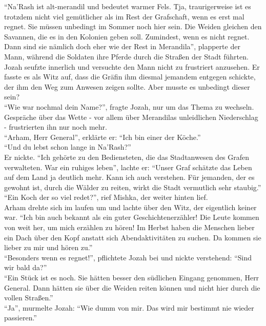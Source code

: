 ``Na'Rash ist alt-merandil und bedeutet warmer Fels. Tja, traurigerweise ist es trotzdem nicht 
viel gemütlicher als im Rest der Grafschaft, wenn es erst mal regnet. Sie müssen unbedingt im 
Sommer noch hier sein. Die Weiden gleichen den Savannen, die es in den Kolonien geben soll. 
Zumindest, wenn es nicht regnet. Dann sind sie nämlich doch eher wie der Rest in Merandila'', 
plapperte der Mann, während die Soldaten ihre Pferde durch die Straßen der Stadt führten.\\
Jozah seufzte innerlich und versuchte den Mann nicht zu frustriert anzusehen. Er fasste es als Witz 
auf, dass die Gräfin ihm diesmal jemandem entgegen schickte, der ihm den Weg zum Anwesen zeigen 
sollte. Aber musste es unbedingt dieser sein?\\
``Wie war nochmal dein Name?'', fragte Jozah, nur um das Thema zu wechseln. Gespräche über das 
Wette - vor allem über Merandilas unleidlichen Niederschlag - frustrierten ihn nur noch mehr.\\
``Arham, Herr General'', erklärte er: ``Ich bin einer der Köche.''\\
``Und du lebst schon lange in Na'Rash?''\\
Er nickte. ``Ich gehörte zu den Bediensteten, die das Stadtanwesen des Grafen verwalteten. War ein 
ruhiges leben'', lachte er: ``Unser Graf schätzte das Leben auf dem Land ja deutlich mehr. Kann ich 
auch verstehen. Für jemanden, der es gewohnt ist, durch die Wälder zu reiten, wirkt die Stadt 
vermutlich sehr staubig.''\\
``Ein Koch der so viel redet?'', rief Mishka, der weiter hinten lief.\\
Arham drehte sich im laufen um und lachte über den Witz, der eigentlich keiner war. ``Ich bin auch 
bekannt als ein guter Geschichtenerzähler! Die Leute kommen von weit her, um mich erzählen zu 
hören! Im Herbst haben die Menschen lieber ein Dach über den Kopf anstatt sich Abendaktivitäten zu 
suchen. Da kommen sie lieber zu mir und hören zu.''\\
``Besonders wenn es regnet!'', pflichtete Jozah bei und nickte verstehend: ``Sind wir bald da?''\\
``Ein Stück ist es noch. Sie hätten besser den südlichen Eingang genommen, Herr General. Dann 
hätten sie über die Weiden reiten können und nicht hier durch die vollen Straßen.''\\
``Ja'', murmelte Jozah: ``Wie dumm von mir. Das wird mir bestimmt nie wieder passieren.''\\

